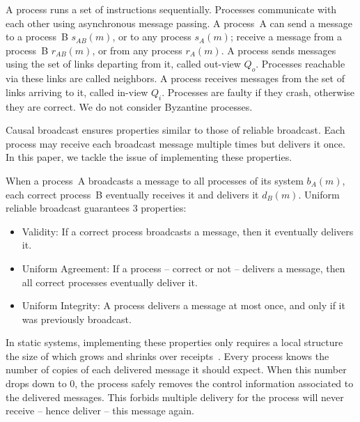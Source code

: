 \begin{definition}[Process]
  A process runs a set of instructions sequentially. Processes communicate with
  each other using asynchronous message passing. A process~A can send a message
  to a process~B $s_{AB}(m)$, or to any process $s_A(m)$; receive a message from
  a process~B $r_{AB}(m)$, or from any process $r_A(m)$. A process sends
  messages using the set of links departing from it, called out-view
  $Q_o$. Processes reachable via these links are called neighbors.  A process
  receives messages from the set of links arriving to it, called in-view $Q_i$.
  Processes are faulty if they crash, otherwise they are correct. We do not
  consider Byzantine processes.
\end{definition}

Causal broadcast ensures properties similar to those of reliable broadcast. Each
process may receive each broadcast message multiple times but delivers it
once. In this paper, we tackle the issue of implementing these properties.

\begin{definition} 
  When a process~A broadcasts a message to all processes of its system $b_A(m)$,
  each correct process~B eventually receives it and delivers it
  $d_B(m)$. Uniform reliable broadcast guarantees 3 properties:
  \begin{itemize}[leftmargin=*]
  \item Validity: If a correct process broadcasts a message, then it
    eventually delivers it.
  \item Uniform Agreement: If a process -- correct or not -- delivers a message,
    then all correct processes eventually deliver it.
  \item Uniform Integrity: A process delivers a message at most once, and only if
    it was previously broadcast.
  \end{itemize}
\end{definition}


In static systems, implementing these properties only requires a local structure
the size of which grows and shrinks over receipts~\cite{raynal2013distributed}.
Every process knows the number of copies of each delivered message it should
expect. When this number drops down to $0$, the process safely removes the
control information associated to the delivered messages. This forbids multiple
delivery for the process will never receive -- hence deliver -- this message
again.

